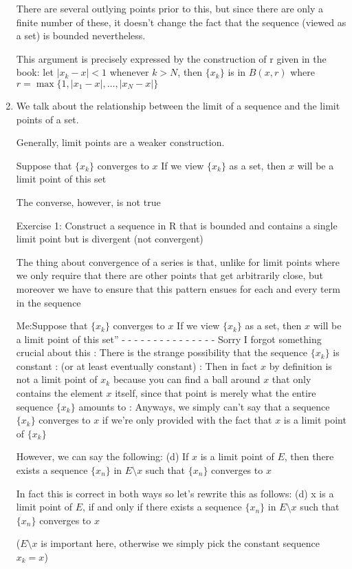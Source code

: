 \begin{enumerate}
There are several outlying points prior to this, but since there are only a finite number of these, it doesn't change the fact that the sequence (viewed as a set) is bounded nevertheless.

This argument is precisely expressed by the construction of r given in the book: let $|x_k-x|<1$ whenever $k>N$, then $\{x_k\}$ is in $B(x,r)$ where $r=\max\{1,|x_1-x|,\dots,|x_N-x|\}$

\item We talk about the relationship between the limit of a sequence and the limit points of a set.

Generally, limit points are a weaker construction.


Suppose that $\{x_k\}$ converges to $x$
If we view $\{x_k\}$ as a set, then $x$ will be a limit point of this set

The converse, however, is not true

Exercise 1: Construct a sequence in R that is bounded and contains a single limit point but is divergent (not convergent)

The thing about convergence of a series is that, unlike for limit points where we only require that there are other points that get arbitrarily close, but moreover we have to ensure that this pattern ensues for each and every term in the sequence

Me:Suppose that $\{x_k\}$ converges to $x$
If we view $\{x_k\}$ as a set, then $x$ will be a limit point of this set”
- - - - - - - - - - - - - - -
Sorry I forgot something crucial about this
:
There is the strange possibility that the sequence $\{x_k\}$ is constant
:
(or at least eventually constant)
:
Then in fact $x$ by definition is not a limit point of $x_k$ because you can find a ball around $x$ that only contains the element $x$ itself, since that point is merely what the entire sequence $\{x_k\}$ amounts to
:
Anyways, we simply can't say that a sequence $\{x_k\}$ converges to $x$ if we're only provided with the fact that $x$ is a limit point of $\{x_k\}$

However, we can say the following:
(d) If $x$ is a limit point of $E$, then there exists a sequence $\{x_n\}$ in $E\setminus x$ such that $\{x_n\}$ converges to $x$

In fact this is correct in both ways so let's rewrite this as follows:
(d) x is a limit point of $E$, if and only if there exists a sequence $\{x_n\}$ in $E\setminus x$ such that $\{x_n\}$ converges to $x$

($E\setminus x$ is important here, otherwise we simply pick the constant sequence $x_k=x$)


\end{enumerate}
